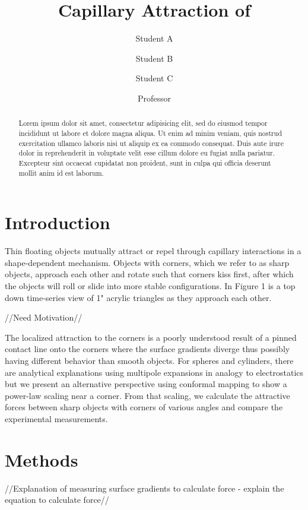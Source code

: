 \documentclass[twocolumn,prl]{revtex4-1}
\begin{document}
\title{Capillary Attraction of }
\author{Student A}
\author{Student B}
\author{Student C}
\author{Professor}

\begin{abstract}
	Lorem ipsum dolor sit amet, consectetur adipisicing elit, sed do eiusmod tempor incididunt ut labore et dolore magna aliqua. Ut enim ad minim veniam, quis nostrud exercitation ullamco laboris nisi ut aliquip ex ea commodo consequat. Duis aute irure dolor in reprehenderit in voluptate velit esse cillum dolore eu fugiat nulla pariatur. Excepteur sint occaecat cupidatat non proident, sunt in culpa qui officia deserunt mollit anim id est laborum.
\end{abstract}

\maketitle

\section{Introduction}
	
	Thin floating objects mutually attract or repel through capillary interactions in a shape-dependent mechanism. Objects with corners, which we refer to as sharp objects, approach each other and rotate such that corners kiss first, after which the objects will roll or slide into more stable configurations. In Figure 1 is a top down time-series view of 1" acrylic triangles as they approach each other. 


	//Need Motivation//
	
	 The localized attraction to the corners is a poorly understood result of a pinned contact line onto the corners where the surface gradients diverge thus possibly having different behavior than smooth objects. For spheres and cylinders, there are analytical explanations using multipole expansions in analogy to electrostatics but we present an alternative perspective using conformal mapping to show a power-law scaling near a corner. From that scaling, we calculate the attractive forces between sharp objects with corners of various angles and compare the experimental measurements.
	 


\section{Methods}
//Explanation of measuring surface gradients to calculate force - explain the equation to calculate force//
\end{document}
